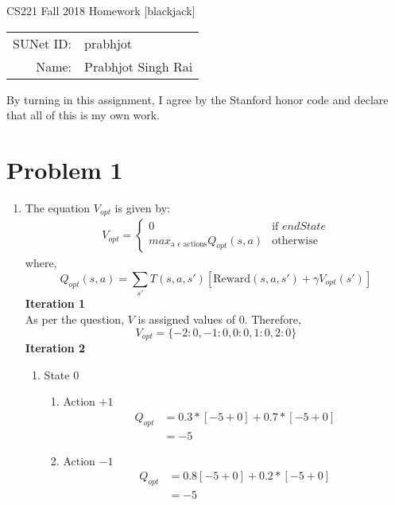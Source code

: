 \documentclass[12pt]{article}
\begin{document}
\begin{center}
{\Large CS221 Fall 2018 Homework [blackjack]}

\begin{tabular}{rl}
SUNet ID: & prabhjot \\
Name: & Prabhjot Singh Rai
\end{tabular}
\end{center}

By turning in this assignment, I agree by the Stanford honor code and declare
that all of this is my own work.

\section*{Problem 1}

\begin{enumerate}[label=(\alph*)]
  \item 
  The equation $V_{opt}$  is given by: \\
  \begin{align*}
  V_{opt} = \begin{cases} 
  0 & \text{if $endState$} \\
  max_{\text{a } \epsilon \text{ actions}} Q_{opt}(s, a) & \text{otherwise}
  \end{cases}
  \end{align*}
  where,
  $$Q_{opt}(s, a) = \sum_{s'} T(s, a, s')[\text{Reward}(s, a, s') + \gamma V_{opt}(s')]$$
  \textbf{Iteration 1} \\
  As per the question, $V$ is assigned values of $0$. Therefore,
  $$V_{opt} = \{-2: 0, -1: 0, 0: 0, 1: 0, 2: 0\}$$
 \textbf{Iteration 2}
 \begin{enumerate}
 	\item State $0$ \\
 	\begin{enumerate}
 		\item Action $+1$ \\
 		\begin{align*}
 		Q_{opt} &= 0.3 * [-5 + 0] + 0.7 * [-5 + 0] \\
 		&= -5
 		\end{align*}
 		\item Action $-1$ \\
 		\begin{align*}
 		Q_{opt} &= 0.8 [-5 + 0] + 0.2 * [-5 + 0] \\
 		&= -5
 		\end{align*}
 	\end{enumerate}

\end{enumerate}
\end{enumerate}
\end{document}
